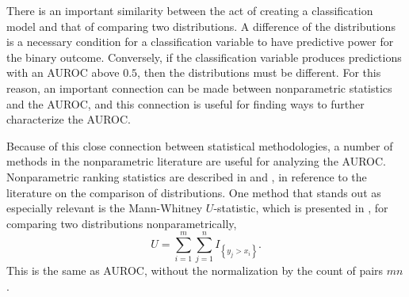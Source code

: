 

There is an important similarity between the act of creating a classification model and that of comparing two distributions.
%
A difference of the distributions is a necessary condition for a classification variable to have predictive power for the binary outcome.
Conversely, if the classification variable produces predictions with an AUROC above $0.5$, then the distributions must be different.
%
For this reason, an important connection can be made between nonparametric statistics and the AUROC, and this connection is useful for finding ways to further characterize the AUROC.

% 






Because of this close connection between statistical methodologies, a number of methods in the nonparametric literature are useful for analyzing the AUROC.
Nonparametric ranking statistics are described in \citet{lehmann2006} and \citet{kendall1990}, in reference to the literature on the comparison of distributions.
One method that stands out as especially relevant is the
Mann-Whitney $U$-statistic, which is presented in \citet{mannwhitney1947}, for comparing two distributions nonparametrically,
%
\begin{equation}
    U = \sum_{i = 1}^{m} \sum_{j = 1}^{n} I_{\left\{ y_j > x_i \right\}}.
\end{equation}
%
This is the same as AUROC, without the normalization by the count of pairs $m n$.

